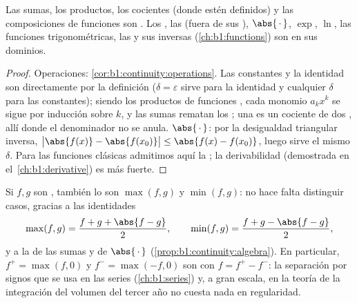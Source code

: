 \begin{proposition}\label{prop:b1:continuity:algebra}
Las sumas, los productos, los cocientes (donde estén definidos) y las
composiciones de funciones  son . Los ,
las  (fuera de sus ),
$\abs{\,\cdot\,}$, $\exp$, $\ln$, las funciones trigonométricas, las
 y sus inversas (\cref{ch:b1:functions}) son
 en sus dominios.
\end{proposition}

\begin{proof}
Operaciones: \cref{cor:b1:continuity:operations}. Las constantes y la
identidad son  directamente por la definición
($\delta = \varepsilon$ sirve para la identidad y cualquier $\delta$
para las constantes); siendo  los productos de funciones
, cada monomio $a_k x^k$ se sigue por inducción sobre $k$,
y las sumas rematan los ; una  es un
cociente de dos ,  allí donde el denominador no se
anula. $\abs{\,\cdot\,}$: por la desigualdad triangular inversa,
$\bigl|\abs{f(x)} - \abs{f(x_0)}\bigr| \leq \abs{f(x) - f(x_0)}$,
luego sirve el mismo $\delta$. Para las funciones clásicas admitimos
aquí la ; la derivabilidad (demostrada en
el~\cref{ch:b1:derivative}) es más fuerte.
\end{proof}

\begin{example}\label{ex:b1:continuity:maxmin}
Si $f, g$ son , también lo son $\max(f, g)$ y
$\min(f, g)$: no hace falta distinguir casos, gracias a las identidades
\[
\max(f, g) = \frac{f + g + \abs{f - g}}{2},
\qquad
\min(f, g) = \frac{f + g - \abs{f - g}}{2},
\]
y a la  de las sumas y de $\abs{\,\cdot\,}$
(\cref{prop:b1:continuity:algebra}). En particular,
$f^+ = \max(f, 0)$ y $f^- = \max(-f, 0)$ son  con
$f = f^+ - f^-$: la separación por signos que se usa en las series
(\cref{ch:b1:series}) y, a gran escala, en la teoría de la
integración del volumen del tercer año no cuesta nada en regularidad.
\end{example}

